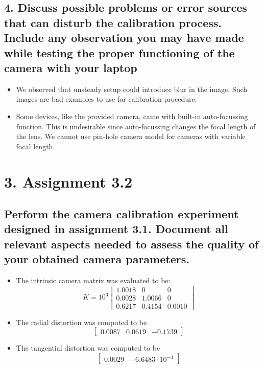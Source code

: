 \subsection*{4. Discuss possible problems or error sources that can disturb the calibration process. Include any observation you may have made while testing the proper functioning of the camera with your laptop}
\begin{itemize}
\item We observed that unsteady setup could introduce blur in the image. Such images are bad examples to use for calibration procedure.
\item Some devices, like the provided camera, came with built-in auto-focussing function. This is undesirable since auto-focussing changes the focal length of the lens. We cannot use pin-hole camera model for cameras with variable focal length.
\end{itemize}

\section*{3. Assignment 3.2}
\subsection*{Perform the camera calibration experiment designed in assignment 3.1. Document all relevant aspects needed to assess the quality of your obtained camera parameters.}
\begin{itemize}
\item The intrinsic camera matrix was evaluated to be:
\begin{equation}
K = 10^3\begin{bmatrix}
1.0018 & 0 & 0 \\
0.0028 & 1.0066 & 0 \\
0.6217 & 0.4154 & 0.0010
\end{bmatrix}
\end{equation}
\item The radial distortion was computed to be 
\begin{equation}
\begin{bmatrix}
0.0087 & 0.0619 & -0.1739
\end{bmatrix}
\end{equation}
\item The tangential distortion was computed to be 
\begin{equation}
\begin{bmatrix}
0.0029 & -6.6483 \cdot 10^{-4}
\end{bmatrix}
\end{equation}
\end{itemize}

